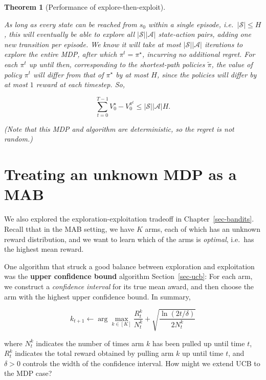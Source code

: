 \documentclass[
  letterpaper,
  DIV=11,
  numbers=noendperiod]{scrreprt}
\theoremstyle{plain}
\theoremstyle{plain}
\newtheorem{theorem}{Theorem}[chapter]
\theoremstyle{definition}
\theoremstyle{definition}
\theoremstyle{remark}
\begin{document}
\begin{theorem}[Performance of
explore-then-exploit]\protect\hypertarget{thm-explore_then_exploit_performance}{}\label{thm-explore_then_exploit_performance}

As long as every state can be reached from \(s_0\) within a single
episode, i.e.~\(|\mathcal{S}| \le H\), this will eventually be able to
explore all \(|\mathcal{S}| |\mathcal{A}|\) state-action pairs, adding
one new transition per episode. We know it will take at most
\(|\mathcal{S}| |\mathcal{A}|\) iterations to explore the entire MDP,
after which \(\pi^t = \pi^\star\), incurring no additional regret. For
each \(\pi^t\) up until then, corresponding to the shortest-path
policies \(\tilde \pi\), the value of policy \(\pi^t\) will differ from
that of \(\pi^\star\) by at most \(H\), since the policies will differ
by at most \(1\) reward at each timestep. So,

\[\sum_{t=0}^{T-1} V^\star_0 - V_0^{\pi^t} \le |\mathcal{S}||\mathcal{A}| H.\]

(Note that this MDP and algorithm are deterministic, so the regret is
not random.)

\end{theorem}

\section{Treating an unknown MDP as a MAB}\label{sec-mdp_mab}

We also explored the exploration-exploitation tradeoff in
Chapter~\ref{sec-bandits}. Recall tthat in the MAB setting, we have
\(K\) arms, each of which has an unknown reward distribution, and we
want to learn which of the arms is \emph{optimal}, i.e.~has the highest
mean reward.

One algorithm that struck a good balance between exploration and
exploitation was the \textbf{upper confidence bound} algorithm
Section~\ref{sec-ucb}: For each arm, we construct a \emph{confidence
interval} for its true mean award, and then choose the arm with the
highest upper confidence bound. In summary,

\[k_{t+1} \gets \arg\max_{k \in [K]} \frac{R^{k}_t}{N^{k}_t} + \sqrt{\frac{\ln(2t/\delta)}{2 N^{k}_t}}\]

where \(N_t^k\) indicates the number of times arm \(k\) has been pulled
up until time \(t\), \(R_t^k\) indicates the total reward obtained by
pulling arm \(k\) up until time \(t\), and \(\delta > 0\) controls the
width of the confidence interval. How might we extend UCB to the MDP
case?
\end{document}
